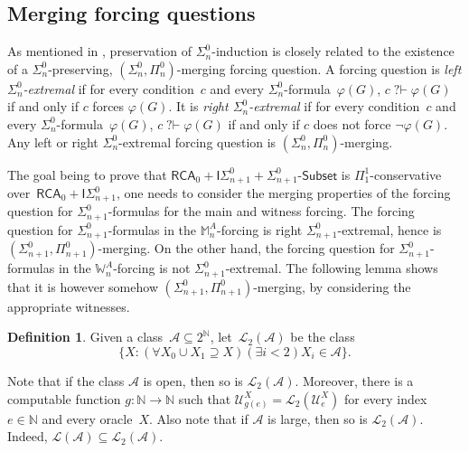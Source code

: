 \documentclass{article}
\def\NN{\mathbb{N}}
\def\WW{\mathbb{W}}
\def\MM{\mathbb{M}}
\def\U{\mathcal{U}}
\def\A{\mathcal{A}}
\def\M{\mathcal{M}}
\renewcommand{\L}[0]{\mathcal{L}}
\newcommand{\cs}{2^{\NN}}
\newcommand{\ISig}{\mathsf{I}\Sigma^0}
\newcommand{\qvdash}{\operatorname{{?}{\vdash}}}
\newcommand{\nqvdash}{\operatorname{{?}{\nvdash}}}
\newcommand{\Sub}[1]{{#1}\mbox{-}\mathsf{Subset}}
\newcommand{\RCA}{\mathsf{RCA}}
\numberwithin{theorem}{section}
\newtheorem{lemma}[theorem]{Lemma}
\theoremstyle{definition}
\newtheorem{definition}[theorem]{Definition}
\begin{document}
\subsection{Merging forcing questions}

As mentioned in , preservation of $\Sigma^0_n$-induction is closely related to the existence of a $\Sigma^0_n$-preserving, $(\Sigma^0_n, \Pi^0_n)$-merging forcing question. A forcing question is \emph{left $\Sigma^0_n$-extremal} if for every condition~$c$ and every $\Sigma^0_n$-formula~$\varphi(G)$, $c \qvdash \varphi(G)$ if and only if $c$ forces $\varphi(G)$. It is \emph{right $\Sigma^0_n$-extremal} if for every condition~$c$ and every $\Sigma^0_n$-formula~$\varphi(G)$, $c \qvdash \varphi(G)$ if and only if $c$ does not force $\neg \varphi(G)$.
Any left or right $\Sigma^0_n$-extremal forcing question is $(\Sigma^0_n, \Pi^0_n)$-merging. 

The goal being to prove that $\RCA_0 + \ISig_{n+1} + \Sub{\Sigma^0_{n+1}}$ is $\Pi^1_1$-conservative over~$\RCA_0 + \ISig_{n+1}$, one needs to consider the merging properties of the forcing question for $\Sigma^0_{n+1}$-formulas for the main and witness forcing.
The forcing question for $\Sigma^0_{n+1}$-formulas in the $\MM^A_n$-forcing is right $\Sigma^0_{n+1}$-extremal, hence is $(\Sigma^0_{n+1}, \Pi^0_{n+1})$-merging. On the other hand, the forcing question for $\Sigma^0_{n+1}$-formulas in the $\WW^A_n$-forcing is not $\Sigma^0_{n+1}$-extremal. The following lemma shows that it is however somehow $(\Sigma^0_{n+1}, \Pi^0_{n+1})$-merging, by considering the appropriate witnesses.

\begin{definition}
    Given a class~$\A \subseteq \cs$, let~$\L_2(\A)$ be the class 
$$\{X : (\forall X_0 \cup X_1 \supseteq X)(\exists i < 2) X_i \in \A\}.$$
\end{definition}

Note that if the class $\A$ is open, then so is $\L_2(\A)$.
Moreover, there is a computable function $g : \NN \to \NN$ such that $\U_{g(e)}^X = \L_2(\U_e^X)$ for every index~$e \in \NN$ and every oracle~$X$. Also note that if $\A$ is large, then so is $\L_2(\A)$. Indeed, $\L(\A) \subseteq \L_2(\A)$.

\end{document}
